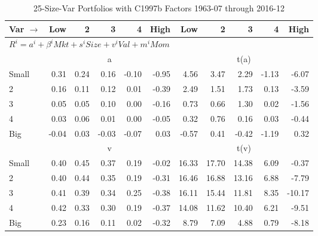 
\begin{table}[!ht]
\footnotesize
\centering
\caption{25-Size-Var Portfolios with C1997b Factors 1963-07 through 2016-12}
\begin{tabular}{lrrrrrrrrrr}
  \toprule
    Var $\rightarrow$ & Low & 2 & 3 & 4 & High & Low & 2 & 3 & 4 & High \\ 
  \midrule
  \multicolumn{11}{l}{$R^i=a^i+\beta^iMkt+s^iSize+v^iVal+m^iMom$} \\

  
    
      & \multicolumn{5}{c}{a} & \multicolumn{5}{c}{t(a)}
    
    \\
      \cmidrule(r){2-6} \cmidrule(r){7-11}

    Small   & 0.31  & 0.24  & 0.16  & -0.10  & -0.95  & 4.56  & 3.47  & 2.29  & -1.13  & -6.07  \\
         2  & 0.16  & 0.11  & 0.12  & 0.01  & -0.39  & 2.49  & 1.51  & 1.73  & 0.13  & -3.59  \\
         3  & 0.05  & 0.05  & 0.10  & 0.00  & -0.16  & 0.73  & 0.66  & 1.30  & 0.02  & -1.56  \\
         4  & 0.03  & 0.06  & 0.01  & 0.00  & -0.05  & 0.32  & 0.76  & 0.16  & 0.03  & -0.44  \\
    Big     & -0.04  & 0.03  & -0.03  & -0.07  & 0.03  & -0.57  & 0.41  & -0.42  & -1.19  & 0.32  \\

  
    
      & \multicolumn{5}{c}{v} & \multicolumn{5}{c}{t(v)}
    
    \\
      \cmidrule(r){2-6} \cmidrule(r){7-11}

    Small   & 0.40  & 0.45  & 0.37  & 0.19  & -0.02  & 16.33  & 17.70  & 14.38  & 6.09  & -0.37  \\
         2  & 0.40  & 0.44  & 0.35  & 0.19  & -0.31  & 16.46  & 16.88  & 13.16  & 6.88  & -7.79  \\
         3  & 0.41  & 0.39  & 0.34  & 0.25  & -0.38  & 16.11  & 15.44  & 11.81  & 8.35  & -10.17  \\
         4  & 0.42  & 0.33  & 0.30  & 0.19  & -0.37  & 14.08  & 11.62  & 10.40  & 6.21  & -9.51  \\
    Big     & 0.23  & 0.16  & 0.11  & 0.02  & -0.32  & 8.79  & 7.09  & 4.88  & 0.79  & -8.18  \\

  
    

\end{tabular}
\end{table}

